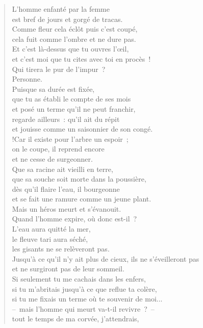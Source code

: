 \documentclass[french,twoside]{book} %
\begin{document}
\begin{verse}
L’homme enfanté par la femme \\
est bref de jours et gorgé de tracas.\\
Comme fleur cela éclôt puis c’est coupé, \\
cela fuit comme l’ombre et ne dure pas.\\
Et c’est là-dessus que tu ouvres l’œil, \\
et c’est moi que tu cites avec toi en procès !\\
Qui tirera le pur de l’impur ? \\
Personne.\\
Puisque sa durée est fixée, \\
que tu as établi le compte de ses mois \\
et posé un terme qu’il ne peut franchir,\\
regarde ailleurs : qu’il ait du répit \\
et jouisse comme un saisonnier de son congé.\\!Car il existe pour l’arbre un espoir ; \\
on le coupe, il reprend encore \\
et ne cesse de surgeonner.\\
Que sa racine ait vieilli en terre, \\
que sa souche soit morte dans la poussière,\\
dès qu’il flaire l’eau, il bourgeonne \\
et se fait une ramure comme un jeune plant.\\
Mais un héros meurt et s’évanouit. \\
Quand l’homme expire, où donc est-il ?\\
L’eau aura quitté la mer, \\
le fleuve tari aura séché,\\
les gisants ne se relèveront pas. \\
Jusqu’à ce qu’il n’y ait plus de cieux, ils ne s’éveilleront pas \\
et ne surgiront pas de leur sommeil.\\
Si seulement tu me cachais dans les enfers, \\
si tu m’abritais jusqu’à ce que reflue ta colère, \\
si tu me fixais un terme où te souvenir de moi...\\
– mais l’homme qui meurt va-t-il revivre ? – \\
tout le temps de ma corvée, j’attendrais, \\

\end{verse}
\end{document}
